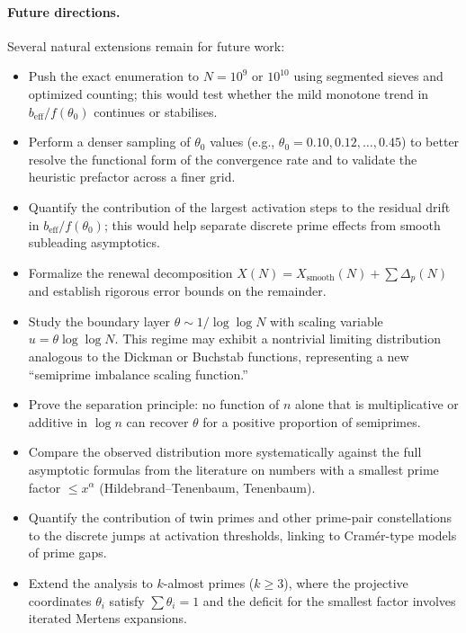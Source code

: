 \documentclass[11pt]{article}
\theoremstyle{definition}
\begin{document}
\paragraph{Future directions.}
Several natural extensions remain for future work:
\begin{itemize}
  \item Push the exact enumeration to \(N = 10^9\) or \(10^{10}\) using segmented
        sieves and optimized counting; this would test whether the mild monotone trend
        in \(b_{\mathrm{eff}}/f(\theta_0)\) continues or stabilises.
  \item Perform a denser sampling of \(\theta_0\) values (e.g., \(\theta_0 = 0.10,0.12,\dots,0.45\))
        to better resolve the functional form of the convergence rate and to validate
        the heuristic prefactor across a finer grid.
  \item Quantify the contribution of the largest activation steps to the residual
        drift in \(b_{\mathrm{eff}}/f(\theta_0)\); this would help separate discrete
        prime effects from smooth subleading asymptotics.
  \item Formalize the renewal decomposition \(X(N) = X_{\text{smooth}}(N) + \sum \Delta_p(N)\)
        and establish rigorous error bounds on the remainder.
  \item Study the boundary layer \(\theta \sim 1/\log\log N\) with scaling variable
        \(u = \theta \log\log N\).  This regime may exhibit a nontrivial limiting
        distribution analogous to the Dickman or Buchstab functions, representing a
        new ``semiprime imbalance scaling function.''
  \item Prove the separation principle: no function of \(n\) alone that is multiplicative
        or additive in \(\log n\) can recover \(\theta\) for a positive proportion of
        semiprimes.
  \item Compare the observed distribution more systematically against the full
        asymptotic formulas from the literature on numbers with a smallest prime
        factor \(\leq x^\alpha\) (Hildebrand--Tenenbaum, Tenenbaum).
  \item Quantify the contribution of twin primes and other prime-pair constellations
        to the discrete jumps at activation thresholds, linking to Cram\'er-type models
        of prime gaps.
  \item Extend the analysis to \(k\)-almost primes (\(k\ge3\)), where the projective
        coordinates \(\theta_i\) satisfy \(\sum\theta_i=1\) and the deficit for the
        smallest factor involves iterated Mertens expansions.
\end{itemize}
\end{document}
